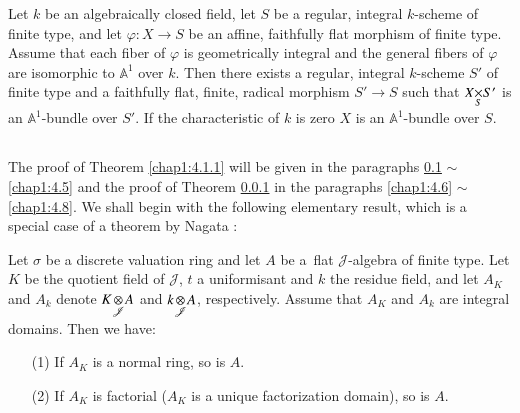 \subsubsection{}\label{chap1:4.1.2}
\begin{theorem*}
  Let $k$ be an algebraically closed field, let $S$ be a regular,
  integral $k$-scheme of finite type, and let $\varphi: X\to S$ be an
  affine, faithfully flat morphism of finite type. Assume that each
  fiber of $\varphi$ is geometrically integral and the general fibers of
  $\varphi$ are isomorphic to $\mathbb{A}^{1}$ over $k$. Then there
  exists a regular, integral $k$-scheme $S'$ of finite type and a
  faithfully flat, finite, radical morphism $S'\to S$ such that
  $\fprod{X}{S'}{S}$ is an $\mathbb{A}^{1}$-bundle over $S'$. If the
  characteristic of $k$ is zero $X$ is an $\mathbb{A}^{1}$-bundle over $S$.
\end{theorem*}

\subsection{}\label{chap1:4.2}
The proof of Theorem \ref{chap1:4.1.1} will be given in the paragraphs
\ref{chap1:4.2} $\sim$ \ref{chap1:4.5} and the proof of Theorem \ref{chap1:4.1.2} in
the paragraphs \ref{chap1:4.6} $\sim$ \ref{chap1:4.8}. We shall begin with the
following elementary result, which is a special case of a theorem by
Nagata \cite{40}:

\begin{lemma*}
Let $\sigma$ be a discrete valuation ring and let $A$ be
a\pageoriginale\ flat $\mathscr{J}$-algebra of finite type. Let $K$ be
the quotient field of $\mathscr{J}$, $t$ a uniformisant and $k$ the
residue field, and let $A_{K}$ and $A_{k}$ denote
$\foprod{K}{A}{\mathscr{J}}$ and $\foprod{k}{A}{\mathscr{J}}$,
respectively. Assume that $A_{K}$ and $A_{k}$ are integral
domains. Then we have:
\begin{itemize}
\item[\rm(1)] If $A_{K}$ is a normal ring, so is $A$.

\item[\rm(2)] If $A_{K}$ is factorial (\iec $A_{K}$ is a unique
  factorization domain), so is $A$.
\end{itemize}
\end{lemma*}

